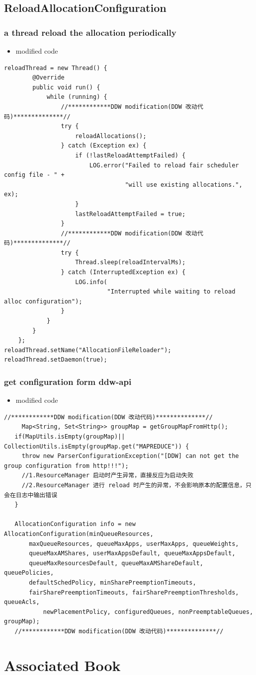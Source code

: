 \documentclass[11pt]{article}
\begin{document}
\subsection{ReloadAllocationConfiguration}
\label{sec:orgc6be7ef}
\subsubsection{a thread reload the allocation periodically}
\label{sec:orga145a17}
\begin{itemize}
\item modified code
\end{itemize}
\begin{verbatim}
reloadThread = new Thread() {
        @Override
        public void run() {
            while (running) {
                //************DDW modification(DDW 改动代码)**************//
                try {
                    reloadAllocations();
                } catch (Exception ex) {
                    if (!lastReloadAttemptFailed) {
                        LOG.error("Failed to reload fair scheduler config file - " +
                                  "will use existing allocations.", ex);
                    }
                    lastReloadAttemptFailed = true;
                }
                //************DDW modification(DDW 改动代码)**************//
                try {
                    Thread.sleep(reloadIntervalMs);
                } catch (InterruptedException ex) {
                    LOG.info(
                             "Interrupted while waiting to reload alloc configuration");
                }
            }
        }
    };
reloadThread.setName("AllocationFileReloader");
reloadThread.setDaemon(true);
\end{verbatim}
\subsubsection{get configuration form ddw-api}
\label{sec:org1657205}
\begin{itemize}
\item modified code
\end{itemize}
\begin{verbatim}
//************DDW modification(DDW 改动代码)**************//
     Map<String, Set<String>> groupMap = getGroupMapFromHttp();
   if(MapUtils.isEmpty(groupMap)|| CollectionUtils.isEmpty(groupMap.get("MAPREDUCE")) {
     throw new ParserConfigurationException("[DDW] can not get the group configuration from http!!!");
     //1.ResourceManager 启动时产生异常，直接反应为启动失败
     //2.ResourceManager 进行 reload 时产生的异常，不会影响原本的配置信息，只会在日志中输出错误
   }

   AllocationConfiguration info = new AllocationConfiguration(minQueueResources,
       maxQueueResources, queueMaxApps, userMaxApps, queueWeights,
       queueMaxAMShares, userMaxAppsDefault, queueMaxAppsDefault,
       queueMaxResourcesDefault, queueMaxAMShareDefault, queuePolicies,
       defaultSchedPolicy, minSharePreemptionTimeouts,
       fairSharePreemptionTimeouts, fairSharePreemptionThresholds, queueAcls,
           newPlacementPolicy, configuredQueues, nonPreemptableQueues, groupMap);
   //************DDW modification(DDW 改动代码)**************//
\end{verbatim}
\section{Associated Book}
\label{sec:org7e7b129}
\end{document}
